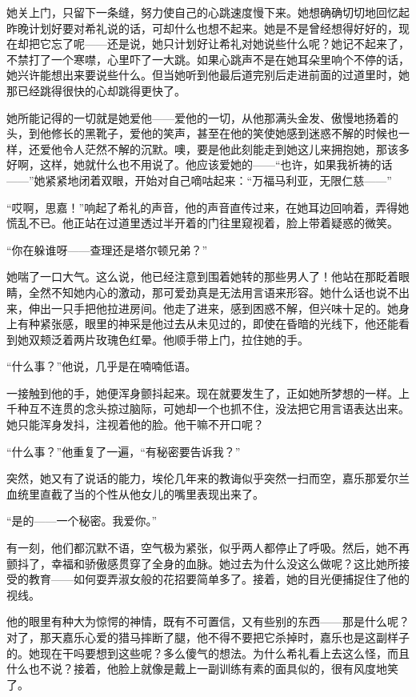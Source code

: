 \par 她关上门，只留下一条缝，努力使自己的心跳速度慢下来。她想确确切切地回忆起昨晚计划好要对希礼说的话，可却什么也想不起来。她是不是曾经想得好好的，现在却把它忘了呢——还是说，她只计划好让希礼对她说些什么呢？她记不起来了，不禁打了一个寒噤，心里吓了一大跳。如果心跳声不是在她耳朵里响个不停的话，她兴许能想出来要说些什么。但当她听到他最后道完别后走进前面的过道里时，她那已经跳得很快的心却跳得更快了。
\par 她所能记得的一切就是她爱他——爱他的一切，从他那满头金发、傲慢地扬着的头，到他修长的黑靴子，爱他的笑声，甚至在他的笑使她感到迷惑不解的时候也一样，还爱他令人茫然不解的沉默。噢，要是他此刻能走到她这儿来拥抱她，那该多好啊，这样，她就什么也不用说了。他应该爱她的——“也许，如果我祈祷的话——”她紧紧地闭着双眼，开始对自己嘀咕起来：“万福马利亚，无限仁慈——”
\par “哎啊，思嘉！”响起了希礼的声音，他的声音直传过来，在她耳边回响着，弄得她慌乱不已。他正站在过道里透过半开着的门往里窥视着，脸上带着疑惑的微笑。
\par “你在躲谁呀——查理还是塔尔顿兄弟？”
\par 她喘了一口大气。这么说，他已经注意到围着她转的那些男人了！他站在那眨着眼睛，全然不知她内心的激动，那可爱劲真是无法用言语来形容。她什么话也说不出来，伸出一只手把他拉进房间。他走了进来，感到困惑不解，但兴味十足的。她身上有种紧张感，眼里的神采是他过去从未见过的，即使在昏暗的光线下，他还能看到她双颊泛着两片玫瑰色红晕。他顺手带上门，拉住她的手。
\par “什么事？”他说，几乎是在喃喃低语。
\par 一接触到他的手，她便浑身颤抖起来。现在就要发生了，正如她所梦想的一样。上千种互不连贯的念头掠过脑际，可她却一个也抓不住，没法把它用言语表达出来。她只能浑身发抖，注视着他的脸。他干嘛不开口呢？
\par “什么事？”他重复了一遍，“有秘密要告诉我？”
\par 突然，她又有了说话的能力，埃伦几年来的教诲似乎突然一扫而空，嘉乐那爱尔兰血统里直截了当的个性从他女儿的嘴里表现出来了。
\par “是的——一个秘密。我爱你。”
\par 有一刻，他们都沉默不语，空气极为紧张，似乎两人都停止了呼吸。然后，她不再颤抖了，幸福和骄傲感贯穿了全身的血脉。她过去为什么没这么做呢？这比她所接受的教育——如何耍弄淑女般的花招要简单多了。接着，她的目光便捕捉住了他的视线。
\par 他的眼里有种大为惊愕的神情，既有不可置信，又有些别的东西——那是什么呢？对了，那天嘉乐心爱的猎马摔断了腿，他不得不要把它杀掉时，嘉乐也是这副样子的。她现在干吗要想到这些呢？多么傻气的想法。为什么希礼看上去这么怪，而且什么也不说？接着，他脸上就像是戴上一副训练有素的面具似的，很有风度地笑了。
